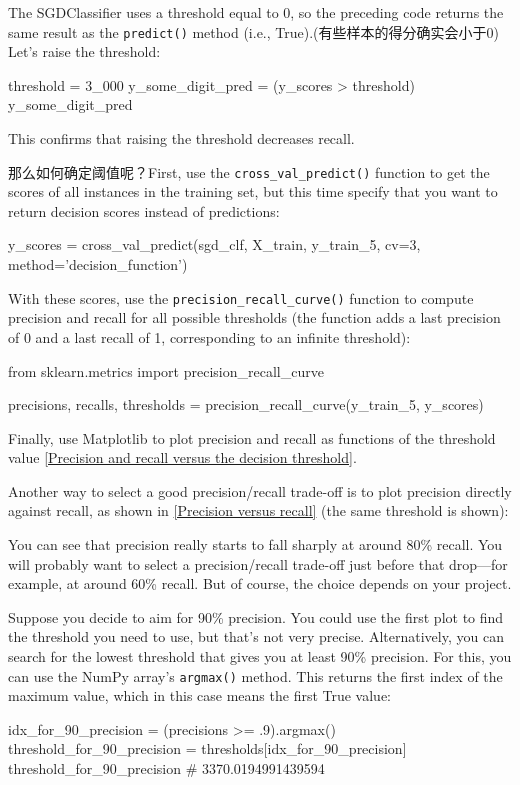 The SGDClassifier uses a threshold equal to 0, so the preceding code returns the same result as the \verb|predict()| method (i.e., True).(有些样本的得分确实会小于0) Let's raise the threshold:
\begin{pyc}
threshold = 3_000
y_some_digit_pred = (y_scores > threshold)
y_some_digit_pred
\end{pyc}

This confirms that raising the threshold decreases recall.

那么如何确定阈值呢？First, use the \verb|cross_val_predict()| function to get the scores of all instances in the training set, but this time specify that you want to return decision scores instead of predictions:
\begin{pyc}
y_scores = cross_val_predict(sgd_clf,
                            X_train,
                            y_train_5,
                            cv=3,
                            method='decision_function')
\end{pyc}

With these scores, use the \verb|precision_recall_curve()| function to compute precision and recall for all possible thresholds (the function adds a last precision of 0 and a last recall of 1, corresponding to an infinite threshold):
\begin{pyc}
from sklearn.metrics import precision_recall_curve

precisions, recalls, thresholds = precision_recall_curve(y_train_5, y_scores)
\end{pyc}

Finally, use Matplotlib to plot precision and recall as functions of the threshold value \autoref{Precision and recall versus the decision threshold}.

Another way to select a good precision/recall trade-off is to plot precision directly against recall, as
shown in \autoref{Precision versus recall} (the same threshold is shown):

You can see that precision really starts to fall sharply at around 80\% recall. You will probably want to select a precision/recall trade-off just before that drop—for example, at around 60\% recall. But of course, the choice depends on your project.

Suppose you decide to aim for 90\% precision. You could use the first plot to find the threshold you need to use, but that's not very precise. Alternatively, you can search for the lowest threshold that gives you at least 90\% precision. For this, you can use the NumPy array's \verb|argmax()| method. This returns the first index of the maximum value, which in this case means the first True value:
\begin{pyc}
idx_for_90_precision = (precisions >= .9).argmax()
threshold_for_90_precision = thresholds[idx_for_90_precision]
threshold_for_90_precision # 3370.0194991439594
\end{pyc}


